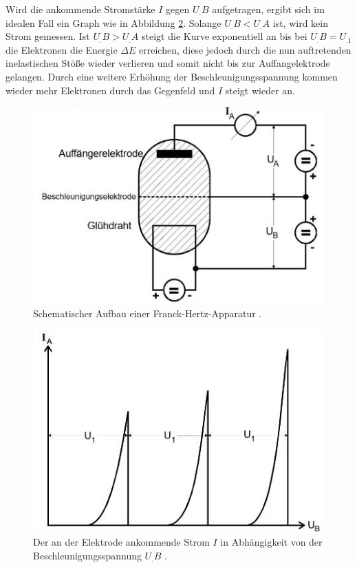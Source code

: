 Wird die ankommende Stromstärke $I$ gegen $U_.B$ aufgetragen, ergibt sich im idealen Fall ein Graph wie in Abbildung \ref{fig:I_theo}.
Solange $U_.B<U_.A$ ist, wird kein Strom gemessen. Ist $U_.B>U_.A$ steigt die Kurve exponentiell an bis bei 
$U_.B=U_.1$ die Elektronen die Energie $\Delta E$ erreichen, diese jedoch durch die nun auftretenden inelastischen Stöße wieder verlieren und somit nicht bis zur Auffangelektrode gelangen. Durch eine weitere Erhöhung der Beschleunigungsspannung kommen wieder mehr Elektronen durch das Gegenfeld und $I$  steigt wieder an.
\begin{figure}
\includegraphics[width=\linewidth-70pt,height=\textheight-70pt,keepaspectratio]{content/images/apparatur.jpg}
\caption{Schematischer Aufbau einer Franck-Hertz-Apparatur \cite{V601}.}
\label{fig:apparat}
\end{figure}
\begin{figure}
\centering
\includegraphics[width=\linewidth-70pt,height=\textheight-70pt,keepaspectratio]{content/images/I_theo.jpg}
\caption{Der an der Elektrode ankommende Strom $I$ in Abhängigkeit von der Beschleunigungsspannung $U_.B$ \cite{V601}.}
\label{fig:I_theo}
\end{figure}
